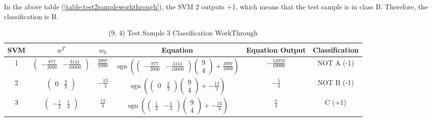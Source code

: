 \documentclass[12pt]{report}
\begin{document}
In the above table (\ref{table:test2sampleworkthrough}), the SVM 2 outputs +1, which means that the test sample is in class B. Therefore, the classification is B.

\begin{table}[H]
	\begin{adjustbox}{width=1.2\textwidth}
		\begin{tabular}{| c | c | c | c | c | c |}
			\hline
			SVM & $w^T$                                                  & $w_{0}$         & Equation & Equation Output & Classification \\ [0.5ex]
			\hline
			1   & $
				\begin{pmatrix}-\frac{877}{2000}&-\frac{3141}{10000}\end{pmatrix}
			$   & $
				\frac{3997}{1000}
			$   & $
				\mathop{sgn}(\begin{pmatrix}-\frac{877}{2000}&-\frac{3141}{10000}\end{pmatrix} \begin{pmatrix}9\\ 4\end{pmatrix} + \frac{3997}{1000})
			$   & $
				-\frac{12059}{10000}
			$   &
			NOT A (-1)                                                                                                                   \\
			\hline
			2   & $\begin{pmatrix}0&\frac{2}{3}\end{pmatrix}$            & $-\frac{13}{3}$ & $
				\mathop{sgn}(\begin{pmatrix}0& \frac{2}{3}\end{pmatrix} \begin{pmatrix}9\\ 4\end{pmatrix} + -\frac{13}{3})
			$   &
			$
				-\frac{5}{3}
			$   &
			NOT B (-1)                                                                                                                   \\
			\hline
			3   & $\begin{pmatrix}-\frac{1}{2}&\frac{1}{4}\end{pmatrix}$ & $\frac{13}{4}$  & $
				\mathop{sgn}(\begin{pmatrix}\frac{1}{2}&-\frac{1}{4}\end{pmatrix} \begin{pmatrix}9\\ 4\end{pmatrix} + -\frac{13}{4})
			$   & $
				\frac{1}{4}
			$   &
			C (+1)                                                                                                                       \\
			\hline
		\end{tabular}
	\end{adjustbox}
	\caption{(9, 4) Test Sample 3 Classification WorkThrough}
	\label{table:test3sampleworkthrough}
\end{table}
\end{document}
